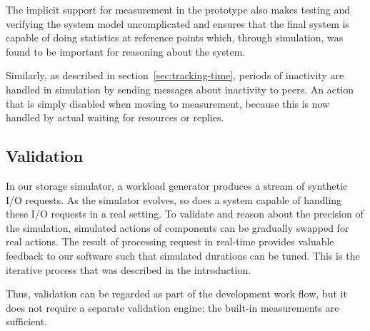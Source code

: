 The implicit support for measurement in the prototype also makes testing and
verifying the system model uncomplicated and ensures that the final system is
capable of doing statistics at reference points which, through simulation, was
found to be important for reasoning about the system.

Similarly, as described in section~\ref{sec:tracking-time}, periods of
inactivity are handled in simulation by sending messages about inactivity to
peers. An action that is simply disabled when moving to measurement, because
this is now handled by actual waiting for resources or replies.

\subsection{Validation}
In our storage simulator, a workload generator produces a stream of synthetic
I/O requests. As the simulator evolves, so does a system capable of handling
these I/O requests in a real setting. To validate and reason about the
precision of the simulation, simulated actions of components can be gradually
swapped for real actions. The result of processing request in real-time
provides valuable feedback to our software such that simulated durations can
be tuned.  This is the iterative process that was described in the introduction.

Thus, validation can be regarded as part of the development work flow, but it
does not require a separate validation engine; the built-in measurements are
sufficient.
